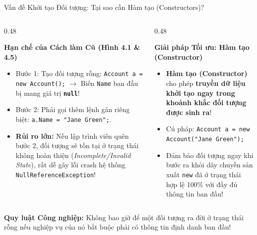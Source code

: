 \documentclass[aspectratio=169, 10pt]{beamer}
\begin{document}
\begin{frame}{Vấn đề Khởi tạo Đối tượng: Tại sao cần Hàm tạo (Constructors)?}
  \begin{columns}[T]
    \begin{column}{0.48\textwidth}
      \begin{block}{\textbf{Hạn chế của Cách làm Cũ (Hình 4.1 \& 4.5)}}
        \begin{itemize}\small
          \item Bước 1: Tạo đối tượng rỗng: \texttt{Account a = new Account();} $\to$ Biến \texttt{Name} ban đầu bị mang giá trị \textbf{\texttt{null}}!
          \item Bước 2: Phải gọi thêm lệnh gán riêng biệt: \texttt{a.Name = "Jane Green";}.
          \item \textbf{Rủi ro lớn:} Nếu lập trình viên quên bước 2, đối tượng sẽ tồn tại ở trạng thái không hoàn thiện (\textit{Incomplete/Invalid State}), rất dễ gây lỗi crash hệ thống \texttt{NullReferenceException}!
        \end{itemize}
      \end{block}
    \end{column}

    \begin{column}{0.48\textwidth}
      \begin{exampleblock}{\textbf{Giải pháp Tối ưu: Hàm tạo (Constructor)}}
        \begin{itemize}\small
          \item \textbf{Hàm tạo (Constructor)} cho phép \textbf{truyền dữ liệu khởi tạo ngay trong khoảnh khắc đối tượng được sinh ra}!
          \item Cú pháp: \texttt{Account a = new Account("Jane Green");}
          \item Đảm bảo đối tượng ngay khi bước ra khỏi dây chuyền sản xuất \texttt{new} đã ở trạng thái hợp lệ 100\% với đầy đủ thông tin ban đầu!
        \end{itemize}
      \end{exampleblock}
    \end{column}
  \end{columns}
  \vspace{2mm}
  \begin{alertblock}{\textbf{Quy luật Công nghiệp:}}
    Không bao giờ để một đối tượng ra đời ở trạng thái rỗng nếu nghiệp vụ của nó bắt buộc phải có thông tin định danh ban đầu!
  \end{alertblock}
\end{frame}
\end{document}
